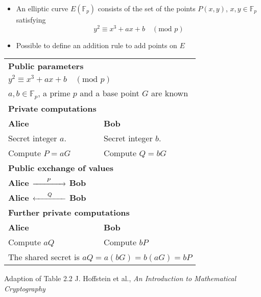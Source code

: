 \documentclass{beamer}
\begin{document}
  \begin{frame}
  \begin{itemize}
  \item{
  An elliptic curve $E(\mathbb{F}_p)$ consists of the set of the points $P(x,y)$, $x,y \in \mathbb{F}_p$ satisfying
  \begin{equation*}
  y^2 \equiv x^3 + ax + b \quad (\text{mod } p)
  \end{equation*}
  }
  \item{
  Possible to define an addition rule to add points on $E$
  }
  \end{itemize}
  \end{frame}
  \begin{frame}
  \begin{tabular}{|p{5cm} p{5cm} |}
      \hline			
      \multicolumn{2}{|p{10cm}|}{\rule{0em}{1.2em}\bf{Public parameters}}\\
      \multicolumn{2}{|p{10cm}|}{$ y^2 \equiv x^3 + ax + b \quad (\text{mod } p)$}\\
      \multicolumn{2}{|p{10cm}|}{$a,b \in \mathbb{F}_p$, a prime $p$ and a base point $G$ are known}\\
      \hline
      \multicolumn{2}{|p{10cm}|}{\rule{0em}{1.2em}\bf{Private computations}}\\
      \bf{\small{Alice}} & \bf{\small{Bob}}\\
      Secret integer $a$. & Secret integer $b$.\\
      Compute $P = aG$ &  Compute $Q = bG$ \\
      \hline
      \multicolumn{2}{|p{10cm}|}{\rule{0em}{1.2em}\bf{Public exchange of values}}\\
      \multicolumn{2}{|p{10cm}|}{
      \bf{\small{Alice}} $\xrightarrow{\hspace*{0.6cm}P\hspace*{0.6cm}}$ \bf{\small{Bob}}
      } \\
      \multicolumn{2}{|p{10cm}|}{
      \bf{\small{Alice}} $\xleftarrow{\hspace*{0.6cm}Q\hspace*{0.6cm}}$ \bf{\small{Bob}}
      }\\
      \hline
      \multicolumn{2}{|p{10cm}|}{\rule{0em}{1.2em}\bf{Further private computations}}\\
      \bf{\small{Alice}} & \bf{\small{Bob}}\\
      Compute $aQ$ & Compute $bP$ \\
      \multicolumn{2}{|p{10cm}|}{
      The shared secret is $aQ = a(bG) = b(aG) = bP$}\\ \hline
    \end{tabular}
    \vfill
    \tiny{Adaption of Table 2.2 J. Hoffstein et al., \emph{An Introduction to Mathematical Cryptography}}
  \end{frame}
\end{document}
